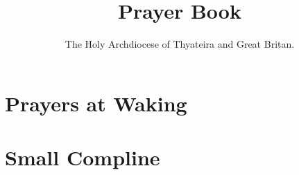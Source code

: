 \documentclass[9pt]{extarticle}
\title{Prayer Book}
\author{The Holy Archdiocese of Thyateira and Great Britan.}
\begin{document}



\maketitle
\pagebreak
\tableofcontents
\pagebreak
\section*{Prayers at Waking}

\pagebreak
\section*{Small Compline}

\pagebreak
\end{document}
